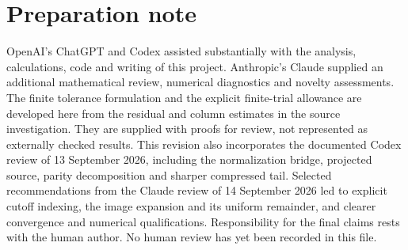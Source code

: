 \section*{Preparation note}
OpenAI's ChatGPT and Codex assisted substantially with the analysis,
calculations, code and writing of this project. Anthropic's Claude supplied
an additional mathematical review, numerical diagnostics and novelty assessments.
The finite tolerance formulation and the
explicit finite-trial allowance are developed here from the residual and
column estimates in the source investigation. They are supplied with proofs
for review, not represented as externally checked results. This revision
also incorporates the documented Codex review of 13 September 2026,
including the normalization bridge, projected source, parity decomposition
and sharper compressed tail. Selected recommendations from the Claude review
of 14 September 2026 led to explicit cutoff indexing, the image expansion
and its uniform remainder, and clearer convergence and numerical qualifications.
Responsibility for the final claims rests with the human author.
No human review has yet been recorded in this file.
\clearpage


